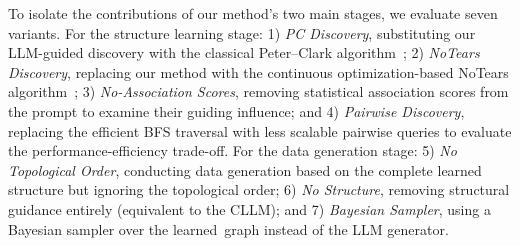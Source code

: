 To isolate the contributions of our method's two main stages, we evaluate seven variants. For the structure learning stage: 1) \textit{PC Discovery}, substituting our LLM-guided discovery with the classical Peter--Clark algorithm~\cite{spirtes2000causation}; 2) \textit{NoTears Discovery}, replacing our method with the continuous optimization-based NoTears algorithm~\cite{zheng2018dags}; 3) \textit{No-Association Scores}, removing statistical association scores from the prompt to examine their guiding influence; and 4) \textit{Pairwise Discovery}, replacing the efficient BFS traversal with less scalable pairwise queries to evaluate the performance-efficiency trade-off. For the data generation stage: 5) \textit{No Topological Order}, conducting data generation based on the complete learned structure but ignoring the topological order; 6) \textit{No Structure}, removing structural guidance entirely (equivalent to the CLLM); and 7) \textit{Bayesian Sampler}, using a Bayesian sampler over the learned~graph instead of the LLM generator.



\begin{table}[t!]
\small
\centering
\setlength{\tabcolsep}{1mm}
\caption{Ablation Study on the Adult Dataset.}
\label{tab:ablation_study}

\end{table}

